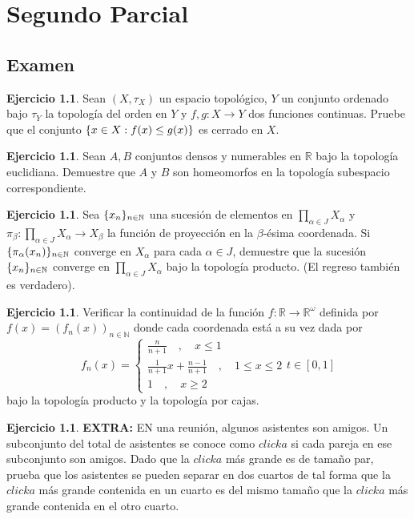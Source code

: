 \documentclass[11pt,a4paper,oneside]{report}
\theoremstyle{definition}
\newtheorem{ejercicio}[definicion]{Ejercicio}
\theoremstyle{plain}
\theoremstyle{remark}
\newcommand{\N}{\mathbb{N}}
\newcommand{\R}{\mathbb{R}}
\DeclarePairedDelimiter{\conj}{\{}{\}}
\begin{document}
\chapter{Segundo Parcial}

\section{Examen}

\begin{ejercicio}
  Sean $(X,\tau_X)$ un espacio topológico, $Y$ un conjunto ordenado bajo $\tau_Y$ la topología
  del orden en $Y$ y $f,g:X\rightarrow Y$ dos funciones continuas. Pruebe que el conjunto 
  $\conj{x\in X: f(x) \leq g(x)}$ es cerrado en $X$.
\end{ejercicio}

\begin{ejercicio}
  Sean $A,B$ conjuntos densos y numerables en $\R$ bajo la topología euclidiana.
  Demuestre que $A$ y $B$ son homeomorfos en la topología subespacio correspondiente.
\end{ejercicio}

\begin{ejercicio}
  Sea $\conj{x_n}_{n\in \N}$ una sucesión de elementos en $\prod_{\alpha \in J}X_\alpha$ y 
  $\pi_\beta:\prod_{\alpha \in J}X_\alpha \rightarrow X_\beta$ la función de proyección en la 
  $\beta$-ésima coordenada. Si $\conj{\pi_\alpha(x_n)}_{n\in \N}$ converge en $X_\alpha$ para
  cada $\alpha \in J$, demuestre que la sucesión $\conj{x_n}_{n\in \N}$ converge en 
  $\prod_{\alpha \in J}X_\alpha$ bajo la topología producto. (El regreso también es verdadero).
\end{ejercicio}

\begin{ejercicio}
  Verificar la continuidad de la función $f: \R \rightarrow \R^{\omega}$ definida por 
  $f(x)=(f_n(x))_{n\in \N}$ donde cada coordenada está a su vez dada por
  \[ f_n(x) = \left\{
  \begin{array}{l}
    \frac{n}{n+1} \quad , \quad x\leq 1 \\
    \frac{1}{n+1}x+\frac{n-1}{n+1} \quad , \quad 1 \leq x \leq 2 \\
    1 \quad , \quad x \geq 2
  \end{array}
  t \in [0,1]
  \right. \]
  bajo la topología producto y la topología por cajas.
\end{ejercicio}

\begin{ejercicio}
  \textbf{EXTRA: }EN una reunión, algunos asistentes son amigos. Un subconjunto del total de asistentes se conoce como $clicka$ 
  si cada pareja en ese subconjunto son amigos. Dado que la $clicka$ más grande es de tamaño par, prueba que los asistentes se pueden 
  separar en dos cuartos de tal forma que la $clicka$ más grande contenida en un cuarto es del mismo tamaño que la $clicka$ más
  grande contenida en el otro cuarto.
\end{ejercicio}
\end{document}
